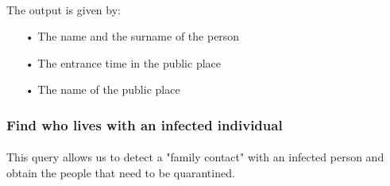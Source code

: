 \documentclass[a4paper,12pt]{article}
\begin{document}
\paragraph{} The output is given by: 
\begin{itemize}
\item[•] The name and the surname of the person
\item[•] The entrance time in the public place
\item[•] The name of the public place
\begin{center}
\end{center}
\end{itemize}
\clearpage
\subsubsection{Find who lives with an infected individual}
\paragraph{} This query allows us to detect a "family contact" with an infected person and obtain the people that need to be quarantined.
\begin{center}
\end{center}
\end{document}
